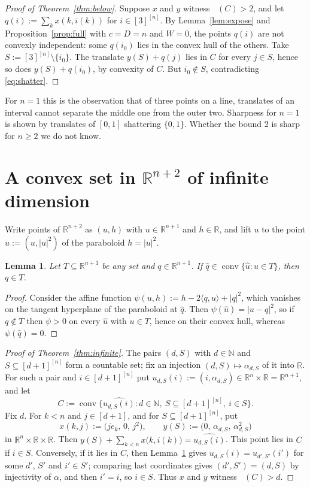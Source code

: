 \documentclass[11pt,a4paper]{article}
\theoremstyle{plain}
\newtheorem{lemma}[theorem]{Lemma}
\theoremstyle{definition}
\DeclareMathOperator{\conv}{conv}
\DeclareMathOperator{\VCn}{\mathrm{VC}_n}
\newcommand{\R}{\mathbb{R}}
\newcommand{\N}{\mathbb{N}}
\begin{document}
\begin{proof}[Proof of Theorem~\ref{thm:below}]
Suppose $x$ and $y$ witness $\VCn(C)>2$, and let $q(i):=\sum_kx(k,i(k))$ for
$i\in[3]^{[n]}$. By Lemma~\ref{lem:expose} and Proposition~\ref{prop:full} with $c=D=n$ and $W=0$,
the points $q(i)$ are not convexly independent: some $q(i_0)$ lies in the convex hull of the
others. Take $S:=[3]^{[n]}\setminus\{i_0\}$. The translate $y(S)+q(j)$ lies in $C$ for every
$j\in S$, hence so does $y(S)+q(i_0)$, by convexity of $C$. But $i_0\notin S$, contradicting
\eqref{eq:shatter}.
\end{proof}

For $n=1$ this is the observation that of three points on a line, translates of an interval cannot
separate the middle one from the outer two. Sharpness for $n=1$ is shown by translates of
$[0,1]$ shattering $\{0,1\}$. Whether the bound $2$ is sharp for $n\ge2$ we do not know.

\section{A convex set in \texorpdfstring{$\R^{n+2}$}{R\^{}(n+2)} of infinite
\texorpdfstring{$\VCn$}{VCn} dimension}\label{sec:infinite}

Write points of $\R^{n+2}$ as $(u,h)$ with $u\in\R^{n+1}$ and $h\in\R$, and lift $u$ to the point
$\hat u:=(u,|u|^{2})$ of the paraboloid $h=|u|^{2}$.

\begin{lemma}\label{lem:paraboloid}
Let $T\subseteq\R^{n+1}$ be any set and $q\in\R^{n+1}$. If $\hat q\in\conv\{\hat u:u\in T\}$, then
$q\in T$.
\end{lemma}

\begin{proof}
Consider the affine function $\psi(u,h):=h-2\langle q,u\rangle+|q|^{2}$, which vanishes on the
tangent hyperplane of the paraboloid at $\hat q$. Then $\psi(\hat u)=|u-q|^{2}$, so if
$q\notin T$ then $\psi>0$ on every $\hat u$ with $u\in T$, hence on their convex hull, whereas
$\psi(\hat q)=0$.
\end{proof}

\begin{proof}[Proof of Theorem~\ref{thm:infinite}]
The pairs $(d,S)$ with $d\in\N$ and $S\subseteq[d+1]^{[n]}$ form a countable set; fix an
injection $(d,S)\mapsto\alpha_{d,S}$ of it into $\R$. For such a pair and $i\in[d+1]^{[n]}$ put
$u_{d,S}(i):=(i,\alpha_{d,S})\in\R^{n}\times\R=\R^{n+1}$, and let
\[
  C:=\conv\bigl\{\widehat{u_{d,S}(i)} : d\in\N,\ S\subseteq[d+1]^{[n]},\ i\in S\bigr\}.
\]
Fix $d$. For $k<n$ and $j\in[d+1]$, and for $S\subseteq[d+1]^{[n]}$, put
\[
  x(k,j):=\bigl(j e_k,\,0,\,j^{2}\bigr),
  \qquad
  y(S):=\bigl(0,\,\alpha_{d,S},\,\alpha_{d,S}^{2}\bigr)
\]
in $\R^{n}\times\R\times\R$. Then $y(S)+\sum_{k<n}x\bigl(k,i(k)\bigr)=\widehat{u_{d,S}(i)}$. This
point lies in $C$ if $i\in S$. Conversely, if it lies in $C$, then Lemma~\ref{lem:paraboloid}
gives $u_{d,S}(i)=u_{d',S'}(i')$ for some $d'$, $S'$ and $i'\in S'$; comparing last coordinates
gives $(d',S')=(d,S)$ by injectivity of $\alpha$, and then $i'=i$, so $i\in S$. Thus $x$ and $y$
witness $\VCn(C)>d$.
\end{proof}
\end{document}
